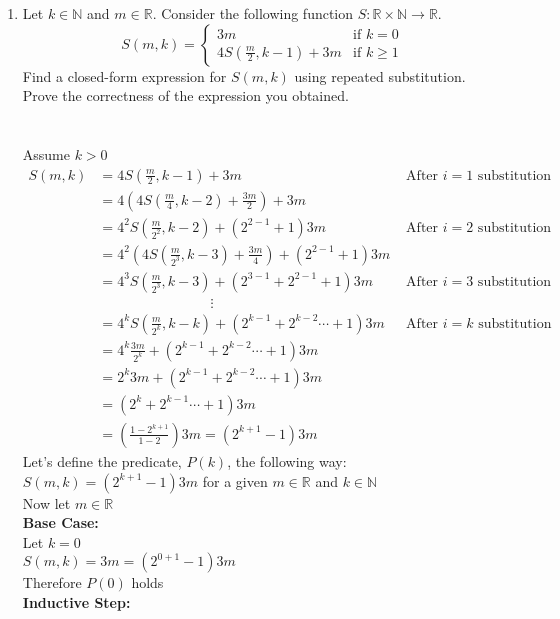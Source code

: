 \documentclass{article}
\begin{document}
\begin{enumerate}
\item Let $k\in\mathbb N$ and $m\in\mathbb R$. 
Consider the following function $S:\mathbb R\times\mathbb N\to \mathbb R$. 
$$S(m,k) = \left\{
\begin{array}{ll}
3m & \mbox{if } k = 0\\
4S(\frac{m}{2}, k-1) + 3m & \mbox{if } k \geq 1
\end{array} \right .$$
Find a closed-form expression for $S(m,k)$ using repeated substitution.\\
Prove the correctness of the expression you obtained.\\
\\\\
Assume $k > 0$
\begin{align*}
 S(m, k) & = 4S(\frac{m}{2}, k-1) +3m 
&\text{ After $i = 1$ substitution}\\
& = 4(4S(\frac{m}{4},k-2) + \frac{3m}{2}) +3m\\
& = {4}^{2}S(\frac{m}{{2}^{2}},k-2) + ({2}^{2-1} + 1)3m
&\text{ After $i = 2$ substitution}\\
& = {4}^{2}(4S(\frac{m}{{2}^{3}},k-3) + \frac{3m}{4}) + ({2}^{2-1} + 1)3m\\
& = {4}^{3}S(\frac{m}{{2}^{3}},k-3) + ({2}^{3-1} + {2}^{2-1} + 1)3m
&\text{ After $i = 3$ substitution}\\
&\quad\quad\quad\quad\quad\quad\quad\quad \vdots\\
& = {4}^{k}S(\frac{m}{{2}^{k}}, k - k) + ({2}^{k-1} + {2}^{k-2} \dotsi + 1)3m
&\text{ After $i = k$ substitution}\\
& = {4}^{k}\frac{3m}{{2}^{k}} + ({2}^{k-1} + {2}^{k-2} \dotsi + 1)3m\\
& = {2}^{k}3m + ({2}^{k-1} + {2}^{k-2} \dotsi + 1)3m\\
& = ({2}^{k} + {2}^{k-1} \dotsi + 1)3m\\
& = (\frac{1 - {2}^{k+1}}{1-2})3m= ({2}^{k+1} - 1)3m
\end{align*}
\newpage
Let's define the predicate, $P(k)$, the following way:\\
$S(m, k) = ({2}^{k+1} - 1)3m$ for a given $m \in\mathbb{R}$ and $k \in \mathbb{N}$\\
Now let $m \in\mathbb{R}$\\
\textbf{Base Case:}\\
Let $k = 0$
\\$S(m, k) = 3m = ({2}^{0+1}-1)3m$
\\Therefore $P(0)$ holds\\
\textbf{Inductive Step:}\\

\end{enumerate}
\end{document}
